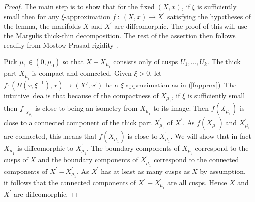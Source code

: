 \documentclass[12pt]{amsart}
\newcommand{\ra}{\rightarrow}
\numberwithin{equation}{section}
\theoremstyle{plain}
\theoremstyle{definition}
\theoremstyle{remark}
\begin{document}
\begin{proof}
The main step is to show that for the fixed $(X, x)$, if
$\xi$ is sufficiently small then for any $\xi$-approximation
$f \: : \: (X, x) \rightarrow X^\prime$ satisfying the hypotheses of the lemma, 
the manifolds $X$ and $X^\prime$ are
diffeomorphic. The proof of this will use the
Margulis thick-thin decomposition. The rest of the assertion then
follows readily from Mostow-Prasad rigidity
\cite{Mostow,Prasad}.

Pick $\mu_1\in (0,\mu_0)$ so that $X -  X_{\mu_1}$
consists only of cusps $U_1,\ldots, U_k$. The thick part
$X_{\mu_1}$ is compact and connected. Given $\xi > 0$, let 
$f:(B(x,\xi^{-1}),x)\ra (X',x')$ be a $\xi$-approximation
as in (\ref{fapprox}).
The intuitive idea is that because of the compactness
of $X_{\mu_1}$, if $\xi$ is sufficiently small then
$f \big|_{X_{\mu_1}}$ is close to being an isometry
from $X_{\mu_1}$ to its image. 
Then $f(X_{\mu_1})$ is close to a connected component of
the thick part $X^\prime_{\mu_1}$ of $X^\prime$. As
$f(X_{\mu_1})$ and $X^\prime_{\mu_1}$ are connected,
this means that $f(X_{\mu_1})$ is close to $X^\prime_{\mu_1}$.
We will show that in fact $X_{\mu_1}$ is diffeomorphic to 
$X^\prime_{\mu_1}$. The boundary components of
$X_{\mu_1}$ correspond to the cusps of $X$ and the
boundary components of 
$X^\prime_{\mu_1}$ correspond to the connected components of
$X^\prime - X^\prime_{\mu_1}$. As $X^\prime$ has at least
as many cusps as $X$ by assumption, it follows that the
connected components of $X^\prime - X^\prime_{\mu_1}$ are
all cusps. Hence $X$ and
$X^\prime$ are diffeomorphic.


\end{proof}
\end{document}
